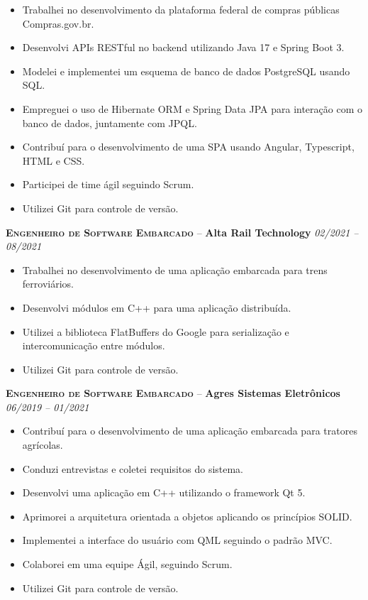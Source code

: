 \documentclass[a4paper,12pt]{article}
\begin{document}
{\small
\begin{itemize}[leftmargin=*,label=\large\textbullet]
    \setlength\itemsep{-0.2em}
    \item Trabalhei no desenvolvimento da plataforma federal de compras públicas Compras.gov.br.
    \item Desenvolvi APIs RESTful no backend utilizando Java 17 e Spring Boot 3.
    \item Modelei e implementei um esquema de banco de dados PostgreSQL usando SQL.
    \item Empreguei o uso de Hibernate ORM e Spring Data JPA para interação com o banco de dados, juntamente com JPQL.
    \item Contribuí para o desenvolvimento de uma SPA usando Angular, Typescript, HTML e CSS.
    \item Participei de time ágil seguindo Scrum.
    \item Utilizei Git para controle de versão.
\end{itemize}
}

\textbf{\textsc{Engenheiro de Software Embarcado}} -- \textbf{Alta Rail Technology} \hfill \textit{02/2021 -- 08/2021}

{\small
\begin{itemize}[leftmargin=*,label=\large\textbullet]
    \setlength\itemsep{-0.2em}
    \item Trabalhei no desenvolvimento de uma aplicação embarcada para trens ferroviários.
    \item Desenvolvi módulos em C++ para uma aplicação distribuída.
    \item Utilizei a biblioteca FlatBuffers do Google para serialização e intercomunicação entre módulos.
    \item Utilizei Git para controle de versão.
\end{itemize}
}

\textbf{\textsc{Engenheiro de Software Embarcado}} -- \textbf{Agres Sistemas Eletrônicos} \hfill \textit{06/2019 -- 01/2021}

{\small
\begin{itemize}[leftmargin=*,label=\large\textbullet]
    \setlength\itemsep{-0.2em}
    \item Contribuí para o desenvolvimento de uma aplicação embarcada para tratores agrícolas.
    \item Conduzi entrevistas e coletei requisitos do sistema.
    \item Desenvolvi uma aplicação em C++ utilizando o framework Qt 5.
    \item Aprimorei a arquitetura orientada a objetos aplicando os princípios SOLID.
    \item Implementei a interface do usuário com QML seguindo o padrão MVC.
    \item Colaborei em uma equipe Ágil, seguindo Scrum.
    \item Utilizei Git para controle de versão.
\end{itemize}
}
\end{document}
